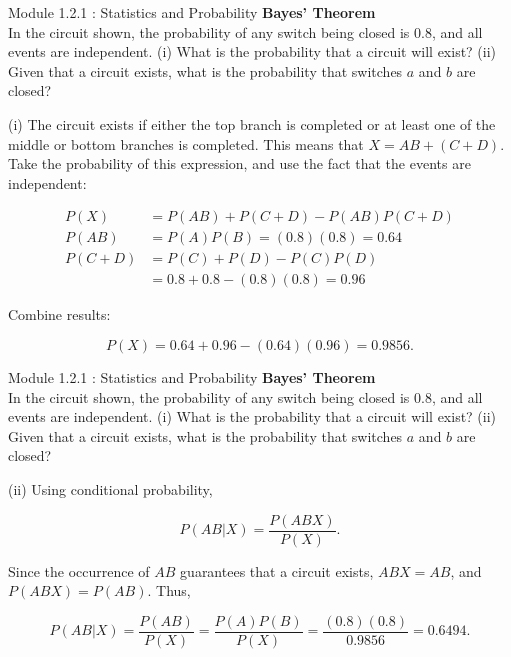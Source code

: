 \documentclass{beamer}
\begin{document}
\begin{frame}{Module 1.2.1 : Statistics and Probability}
\small
\textbf{Bayes' Theorem} \\ \vspace{0.25cm}
\scriptsize
In the circuit shown, the probability of any switch being closed is $0.8$, and all events are independent.  (i) What is the probability that a circuit will exist? (ii) Given that a circuit exists, what is the probability that switches $a$ and $b$ are closed? \\ \vspace{0.25cm}

(i) The circuit exists if either the top branch is completed or at least one of the middle or bottom branches is completed.  This means that $X = AB + (C + D)$.  Take the probability of this expression, and use the fact that the events are independent:

\begin{align}
P(X) &= P(AB)+P(C+D)-P(AB)P(C+D) \\
P(AB) &= P(A)P(B) =(0.8)(0.8)=0.64 \\
P(C+D) &=P(C)+P(D)-P(C)P(D) \\
&=0.8+0.8-(0.8)(0.8) =0.96
\end{align}

Combine results:

\begin{equation}
P(X) = 0.64+0.96-(0.64)(0.96)=0.9856.
\end{equation}
\end{frame}

\begin{frame}{Module 1.2.1 : Statistics and Probability}
\small
\textbf{Bayes' Theorem} \\ \vspace{0.25cm}
\scriptsize
In the circuit shown, the probability of any switch being closed is $0.8$, and all events are independent.  (i) What is the probability that a circuit will exist? (ii) Given that a circuit exists, what is the probability that switches $a$ and $b$ are closed? \\ \vspace{0.25cm}

(ii) Using conditional probability,

\begin{equation}
P(AB|X)=\frac{P(ABX)}{P(X)}.
\end{equation}

Since the occurrence of $AB$ guarantees that a circuit exists, $ABX = AB$, and $P(ABX) = P(AB)$. Thus,

\begin{equation}
P(AB|X) = \frac{P(AB)}{P(X)} = \frac{P(A)P(B)}{P(X)} = \frac{(0.8)(0.8)}{0.9856} = 0.6494.
\end{equation}
\end{frame}
\end{document}
